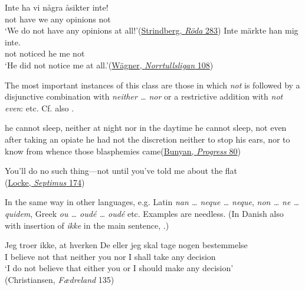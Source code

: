 \ea \label{ex:07-38}
\ea
\gll Inte ha vi några åsikter inte!\\
 not have we any opinions not\\
\glt `We do not have any opinions at all!'\hfill(\href{https://litteraturbanken.se/f%C3%B6rfattare/StrindbergA/titlar/RodaRummet/sida/227/etext}{Strindberg, \textit{Röda} 283})
\ex 
\gll Inte märkte han mig inte.\\
 not noticed he me not\\
\glt `He did not notice me at all.'\hfill(\href{https://litteraturbanken.se/f%C3%B6rfattare/W%C3%A4gnerE/titlar/Norrtullsligan/sida/156/etext}{Wägner, \textit{Norrtullsligan} 108})
\z
\z

The most important instances of this class are those in which \textit{not} is followed by a disjunctive combination with \textit{neither {\dots} nor} or a restrictive addition with \textit{not even}:  etc. Cf. also .

\ea \label{ex:07-40}
\ea he cannot sleep, neither at night nor in the daytime
\ex he cannot sleep, not even after taking an opiate %
\ex he had not the discretion neither to stop his ears, nor to know from whence those blasphemies came\hfill(\href{https://archive.org/details/bunyanspilgrims00moffgoog/page/86/mode/2up?q=%22discretion+neither%22&view=theater}{Bunyan, \textit{Progress} 80}) %
\z
\z

\ea \label{ex:07-43} You'll do no such thing---not until you've told me about the flat\\\hfill(\href{https://archive.org/details/septimus00unkngoog/page/n169/mode/2up?q=%22do+no+such+thing%22&view=theater}{Locke, \textit{Septimus} 174}) %
\z

In the same way in other languages, e.g. Latin \textit{nan {\dots} neque {\dots} neque}, \textit{non {\dots} ne {\dots} quidem}, Greek \textit{ou {\dots} oudé {\dots} oudé} etc. Examples are needless. (In Danish also with insertion of \textit{ikke} in the main sentence, .)

\ea \label{ex:07-44}
\gll Jeg troer ikke, at hverken De eller jeg skal tage nogen bestemmelse\\
 I believe not that neither you nor I shall take any decision\\
\glt `I do not believe that either you or I should make any decision'\\\hfill(Christiansen, \textit{Fædreland} 135) %
\z

